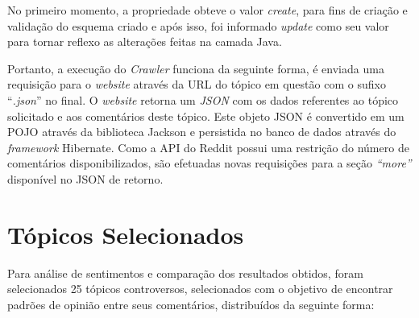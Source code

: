No primeiro momento, a propriedade obteve o valor \textit{create}, para fins de
criação e validação do esquema criado e após isso, foi informado \textit{update}
como seu valor para tornar reflexo as alterações feitas na camada Java.

Portanto, a execução do \textit{Crawler} funciona da seguinte forma, é enviada
uma requisição para o \textit{website} através da URL do tópico em questão com o
sufixo ``\textit{.json}'' no final. O \textit{website} retorna um
\textit{JSON} com os dados referentes ao tópico solicitado e aos comentários
deste tópico. Este objeto \ac{JSON} é convertido em um \ac{POJO} através da
biblioteca Jackson e persistida no banco de dados através do \textit{framework}
Hibernate. Como a API do Reddit possui uma restrição do número de comentários
disponibilizados, são efetuadas novas requisições para a seção \textit{``more''}
disponível no \ac{JSON} de retorno.

\section{Tópicos Selecionados}

Para análise de sentimentos e comparação dos resultados obtidos, foram
selecionados 25 tópicos controversos, selecionados com o objetivo de encontrar
padrões de opinião entre seus comentários, distribuídos da seguinte forma:

